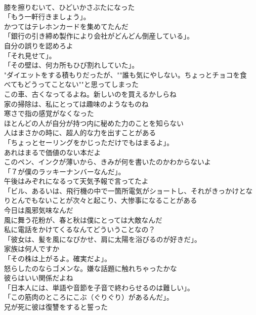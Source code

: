 \documentclass[8pt]{extreport}
\begin{document}
\begin{CJK}{UTF8}{min}
\\	膝を擦りむいて、ひどいかさぶたになった	
\\	「もう一軒行きましょう」。	
\\	かつてはテレホンカードを集めてたんだ	
\\	「銀行の引き締め製作により会社がどんどん倒産している」。	
\\	自分の誤りを認めろよ	
\\	「それ見せて」。	
\\	「その壁は、何カ所もひび割れしていた」。	
\\	"ダイエットをする積もりだったが、""誰も気にやしない。ちょっとチョコを食べてもどうってことない""と思ってしまった
\\	この車、古くなってるよね。新しいのを買えるかしらね	
\\	家の掃除は、私にとっては趣味のようなものね	
\\	寒さで指の感覚がなくなった	
\\	ほとんどの人が自分が持つ内に秘めた力のことを知らない	
\\	人はまさかの時に、超人的な力を出すことがある	
\\	「ちょっとセーリングをかじっただけでもはまるよ」。	
\\	あれはまるで価値のない本だよ	
\\	このペン、インクが薄いから、きみが何を書いたのかわからないよ	
\\	「７が僕のラッキーナンバーなんだ」。	
\\	午後はみぞれになるって天気予報で言ってたよ	
\\	「ビル、あるいは、飛行機の中で一箇所電気がショートし、それがきっかけとなりとんでもないことが次々と起こり、大惨事になることがある	
\\	今日は風邪気味なんだ	
\\	風に舞う花粉が、春と秋は僕にとっては大敵なんだ	
\\	私に電話をかけてくるなんてどういうことなの？	
\\	「彼女は、髪を風になびかせ、肩に太陽を浴びるのが好きだ」。	
\\	家族は何人ですか	
\\	「その株は上がるよ。確実だよ」。	
\\	怒らしたのならゴメンな。嫌な話題に触れちゃったかな	
\\	彼らはいい関係だよね	
\\	「日本人には、単語や音節を子音で終わらせるのは難しい」。	
\\	「この筋肉のところにこぶ（ぐりぐり）があるんだ」。	
\\	兄が死に彼は復讐をすると誓った	

\end{CJK}
\end{document}

